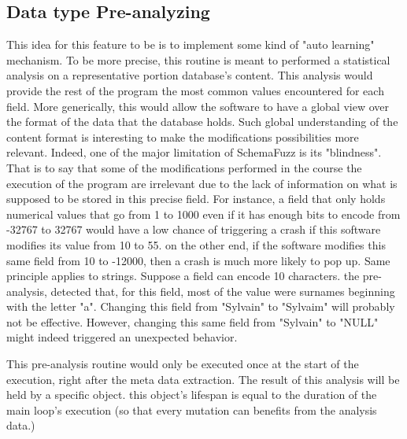\documentclass{article}
\begin{document}
\begin{empfile}
		\subsection{Data type Pre-analyzing}
This idea for this feature to be is to implement some kind of "auto learning" mechanism.
To be more precise, this routine is meant to performed a statistical analysis on a representative portion database's content. This analysis would provide the rest of the program the most common values encountered for each field. More generically, this would allow the software to have a global view over the format of the data that the database holds.
Such global understanding of the content format is   interesting to make the modifications possibilities more relevant. Indeed, one of the major limitation of SchemaFuzz is its "blindness".
That is to say that some of the modifications performed in the course the execution of the program are irrelevant due to the lack of information on what is supposed to be stored in this precise field.
For instance, a field that only holds numerical values that go from 1 to 1000 even if it has enough bits to encode from -32767 to 32767 would have a   low chance of triggering a crash if this software modifies its value from 10 to 55.
on the other end, if the software modifies this   same field from 10 to -12000, then a crash is much more likely to pop up.
Same principle applies to strings. Suppose a field can encode 10 characters.
the pre-analysis, detected that, for this field, most of the value were surnames beginning with the letter "a". Changing this field from "Sylvain" to "Sylvaim" will probably not be effective. However, changing this same field from "Sylvain" to "NULL" might indeed triggered an unexpected behavior. 
  
This pre-analysis routine would only be executed once at the start of the execution, right after the meta data extraction. The result of this analysis will be held by a specific object. 
this object's lifespan is equal to the duration of the main loop's execution (so that every mutation can benefits from the analysis data.)
		

\end{empfile}
\end{document}
